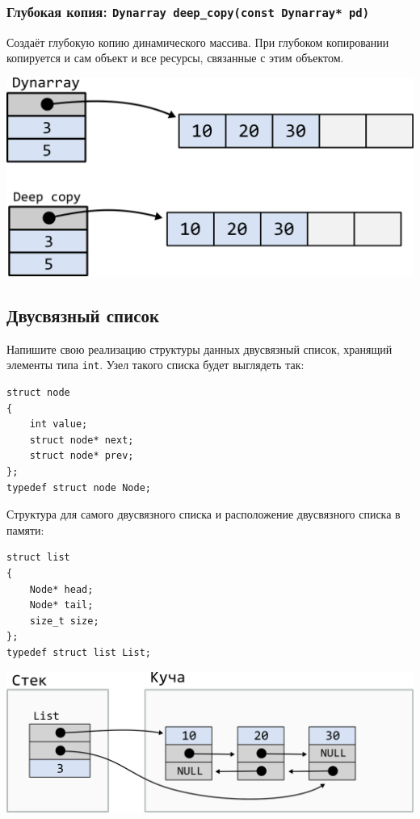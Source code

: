 \documentclass{article}
\begin{document}
\subsubsection{Глубокая копия: \texttt{Dynarray deep\_copy(const Dynarray* pd)}}
Создаёт глубокую копию динамического массива. При глубоком копировании копируется и сам объект и все ресурсы, связанные с этим объектом.
\begin{center}
\includegraphics[scale=0.8]{../images/dynarray_deep.png}
\end{center}

\newpage
\subsection{Двусвязный список}
Напишите свою реализацию структуры данных двусвязный список, хранящий элементы типа \texttt{int}.
Узел такого списка будет выглядеть так:
\begin{lstlisting}
struct node 
{
    int value;
    struct node* next;
    struct node* prev;
};
typedef struct node Node;
\end{lstlisting}
Структура для самого двусвязного списка и расположение двусвязного списка в памяти:\\

\noindent\begin{minipage}{.35\textwidth}
\begin{lstlisting}
struct list 
{
    Node* head;
    Node* tail;
    size_t size;
};
typedef struct list List;
\end{lstlisting}
\end{minipage}
\begin{minipage}{.55\textwidth}
\includegraphics[scale=0.8]{../images/list.png}
\end{minipage}
\end{document}
